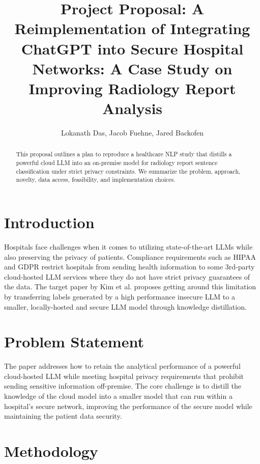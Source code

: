 \documentclass[letterpaper]{article} %
\title{Project Proposal: A Reimplementation of Integrating ChatGPT into Secure Hospital Networks: A Case Study on Improving Radiology Report Analysis }
\author{
  Lokanath Das, Jacob Fuehne, Jared Backofen
}
\begin{document}
\maketitle

\begin{abstract}
This proposal outlines a plan to reproduce a healthcare NLP study that distills a powerful cloud LLM into an on-premise model for radiology report sentence classification under strict privacy constraints. We summarize the problem, approach, novelty, data access, feasibility, and implementation choices.
\end{abstract}

\section{Introduction}
Hospitals face challenges when it comes to utilizing state-of-the-art LLMs while also preserving the privacy of patients. Compliance requirements such as HIPAA and GDPR restrict hospitals from sending health information to some 3rd-party cloud-hosted LLM services where they do not have strict privacy guarantees of the data. The target paper by Kim {et al.} \cite{kim2024chatgpt} proposes getting around this limitation by transferring labels generated by a high performance insecure LLM to a smaller, locally-hosted and secure LLM model through knowledge distillation.


\section{Problem Statement}
The paper addresses how to retain the analytical performance of a powerful cloud-hosted LLM while meeting hospital privacy requirements that prohibit sending sensitive information off-premise. The core challenge is to distill the knowledge of the cloud model into a smaller model that can run within a hospital’s secure network, improving the performance of the secure model while maintaining the patient data security.


\section{Methodology}
\end{document}

